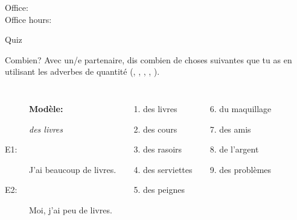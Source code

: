 \documentclass{beamer}
\subtitle[Articles et adverbes]{Les articles de toilette et les adverbes}
\begin{document}
  \begin{frame}
    \titlepage
    \tiny{Office: \\
          Office hours: }
  \end{frame}

  \begin{frame}{}
    \begin{center}
      \Large Quiz
    \end{center}
  \end{frame}

  \begin{frame}{Combien? }
    Avec un/e partenaire, dis combien de choses suivantes que tu as en utilisant les adverbes de quantité (, , , , ). \\
    \begin{columns}[t]
        \begin{description}
          \item[] \textbf{Modèle:}
          \item[] \emph{des livres}
          \item[E1:] J'ai beaucoup de livres.
          \item[E2:] Moi, j'ai peu de livres.
        \end{description}
        \begin{enumerate}
          \item des livres
          \item des cours
          \item des rasoirs
          \item des serviettes
          \item des peignes
        \end{enumerate}
        \begin{enumerate}
          \setcounter{enumi}{5}
          \item du maquillage
          \item des amis
          \item de l'argent
          \item des problèmes
        \end{enumerate}
    \end{columns}
  \end{frame}
\end{document}

